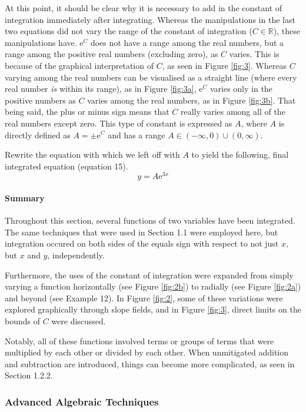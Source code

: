 \documentclass{article}
\begin{document}
At this point, it should be clear why it is necessary to add in the constant of integration immediately after integrating. Whereas the manipulations in the last two equations did not vary the range of the constant of integration ($C\in\mathbb{R}$), these manipulations have. $\text{e}^C$ does not have a range among the real numbers, but a range among the positive real numbers (excluding zero), as $C$ varies. This is because of the graphical interpretation of $C$, as seen in Figure \ref{fig:3}. Whereas $C$ varying among the real numbers can be visualised as a straight line (where every real number \emph{is} within its range), as in Figure \ref{fig:3a}, $\text{e}^C$ varies only in the positive numbers as $C$ varies among the real numbers, as in Figure \ref{fig:3b}. That being said, the plus or minus sign means that $C$ really varies among all of the real numbers except zero. This type of constant is expressed as $A$, where $A$ is directly defined as $A=\pm\text{e}^C$ and has a range $A\in(-\infty,0)\cup(0,\infty)$.\par
Rewrite the equation with which we left off with $A$ to yield the following, final integrated equation (equation 15).
\begin{equation}
    y=A\text{e}^{3x}
\end{equation}
\paragraph{Summary} Throughout this section, several functions of two variables have been integrated. The same techniques that were used in Section 1.1 were employed here, but integration occured on both sides of the equals sign with respect to not just $x$, but $x$ and $y$, independently.\par
Furthermore, the uses of the constant of integration were expanded from simply varying a function horizontally (see Figure \ref{fig:2b}) to radially (see Figure \ref{fig:2a}) and beyond (see Example 12). In Figure \ref{fig:2}, some of these variations were explored graphically through slope fields, and in Figure \ref{fig:3}, direct limits on the bounds of $C$ were discussed.\par
Notably, all of these functions involved terms or groups of terms that were multiplied by each other or divided by each other. When unmitigated addition and subtraction are introduced, things can become more complicated, as seen in Section 1.2.2.
\newpage

\subsubsection{Advanced Algebraic Techniques}
\end{document}
